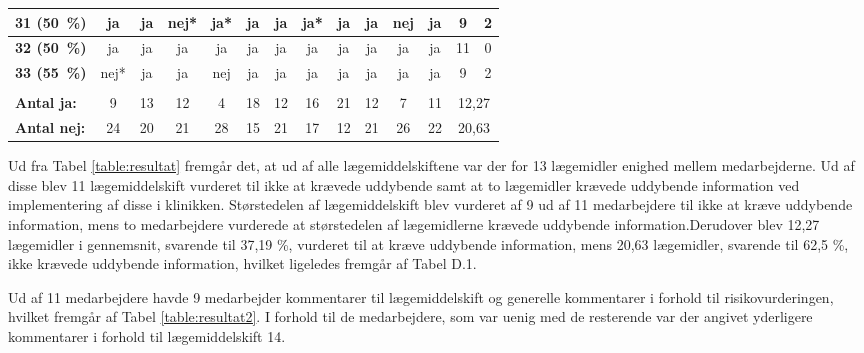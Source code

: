 \begin{longtable} {|l|c|c|c|c|c|c|c|c|c|c|c|c|c|}
\cellcolor[HTML]{C0C0C0}\textbf{31 (50~\%)}	&ja	&ja	&nej*&ja*	&ja	&ja	&ja*	&ja	&ja	&nej&	ja  & \cellcolor[HTML]{EFEFEF}9 & \cellcolor[HTML]{EFEFEF}2  \\ \hline
\cellcolor[HTML]{C0C0C0}\textbf{32 (50~\%)}	&\cellcolor[HTML]{34CDF9}ja	&\cellcolor[HTML]{34CDF9}ja	&\cellcolor[HTML]{34CDF9}ja	&\cellcolor[HTML]{34CDF9}ja	&\cellcolor[HTML]{34CDF9}ja	&\cellcolor[HTML]{34CDF9}ja	&\cellcolor[HTML]{34CDF9}ja	&\cellcolor[HTML]{34CDF9}ja	&\cellcolor[HTML]{34CDF9}ja	&\cellcolor[HTML]{34CDF9}ja	&\cellcolor[HTML]{34CDF9}ja  & \cellcolor[HTML]{EFEFEF}11 & \cellcolor[HTML]{EFEFEF}0\\ \hline
\cellcolor[HTML]{C0C0C0}\textbf{33 (55~\%)}	&nej*&	ja	&ja	&nej	&ja	&ja	&ja	&ja	&ja	&ja	&ja & \cellcolor[HTML]{EFEFEF}9 & \cellcolor[HTML]{EFEFEF}2\\ \hline
\rowcolor[HTML]{EFEFEF}\multicolumn{14}{|r|}{\textbf{Gennemsnit:}}\\
\rowcolor[HTML]{EFEFEF}\textbf{Antal ja:} & 9 & 13 &	12 &	 4 &18&	12&	16&	21&	12&	7&	11 & \multicolumn{2}{|c|}{12,27}\\ \hline
\rowcolor[HTML]{EFEFEF}\textbf{Antal nej:} &24 &	20&	21&	28&	15&	21&	17&	12&	21&	26&	22 &\multicolumn{2}{|c|}{20,63} \\ \hline
\end{longtable}

Ud fra Tabel \ref{table:resultat} fremgår det, at ud af alle lægemiddelskiftene var der for 13 lægemidler enighed mellem medarbejderne. Ud af disse blev 11 lægemiddelskift vurderet til ikke at krævede uddybende samt at to lægemidler krævede uddybende information ved
implementering af disse i klinikken. Størstedelen af lægemiddelskift blev vurderet af 9 ud af 11 medarbejdere til ikke at kræve uddybende information, mens to medarbejdere vurderede at størstedelen af lægemidlerne krævede uddybende information.Derudover blev 12,27 lægemidler i gennemsnit, svarende til 37,19 \%, vurderet til at kræve uddybende information, mens 20,63 lægemidler, svarende til 62,5 \%, ikke krævede uddybende information, hvilket ligeledes fremgår af Tabel D.1.

Ud af 11 medarbejdere havde 9 medarbejder kommentarer til lægemiddelskift og generelle kommentarer i forhold til risikovurderingen, hvilket fremgår af Tabel \ref{table:resultat2}. I forhold til de medarbejdere, som var uenig med de resterende var der angivet yderligere kommentarer i forhold til lægemiddelskift 14. 

